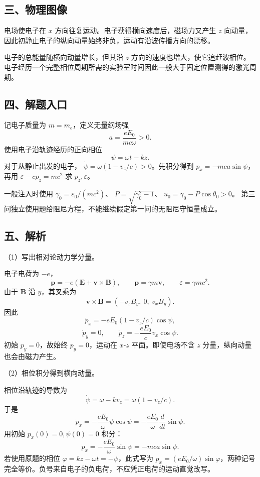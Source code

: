 \documentclass[12pt,a4paper,fontset=fandol]{ctexart}
\begin{document}
\subsection{三、物理图像}\label{ux4e09ux7269ux7406ux56feux50cf-3}

电场使电子在 \(x\) 方向往复运动。电子获得横向速度后，磁场力又产生 \(z\)
向动量，因此初静止电子的纵向动量始终非负，运动有沿波传播方向的漂移。

电子的总能量随横向动量增长，但其沿 \(z\)
方向的速度也增大，使它追赶波相位。电子经历一个完整相位周期所需的实验室时间因此一般大于固定位置测得的激光周期。

\subsection{四、解题入口}\label{ux56dbux89e3ux9898ux5165ux53e3-3}

记电子质量为 \(m=m_e\)，定义无量纲场强 \[
a=\frac{eE_0}{mc\omega}>0.
\] 使用电子沿轨迹经历的正向相位 \[
\psi=\omega t-kz.
\] 对于从静止出发的电子， \(\dot\psi=\omega(1-v_z/c)>0\)。先积分得到
\(p_x=-mca\sin\psi\)，再用 \(\varepsilon-cp_z=mc^2\) 求
\(p_z,\varepsilon\)。

一般注入时使用 \(\gamma_0=\varepsilon_0/(mc^2)\)、
\(P=\sqrt{\gamma_0^2-1}\)、 \(u_0=\gamma_0-P\cos\theta_0>0\)。
第三问独立使用题给阻尼方程，不能继续假定第一问的无阻尼守恒量成立。

\subsection{五、解析}\label{ux4e94ux89e3ux6790-3}

（1）写出相对论动力学分量。

电子电荷为 \(-e\)， \[
\dot{\mathbf p}=-e(\mathbf E+\mathbf v\times\mathbf B),\qquad
\mathbf p=\gamma m\mathbf v,\qquad
\varepsilon=\gamma mc^2.
\] 由于 \(\mathbf B\) 沿 \(y\)，其叉乘为 \[
\mathbf v\times\mathbf B=(-v_zB_y,\ 0,\ v_xB_y).
\] 因此 \[
\dot p_x=-eE_0(1-v_z/c)\cos\psi,
\] \[
\dot p_y=0,\qquad
\dot p_z=-\frac{eE_0}{c}v_x\cos\psi.\tag{4.1}
\] 初始 \(p_y=0\)，故始终 \(p_y=0\)，运动在 \(x\)-\(z\)
平面。即使电场不含 \(z\) 分量，纵向动量也会由磁力产生。

（2）相位积分得到横向动量。

相位沿轨迹的导数为 \[
\dot\psi=\omega-kv_z
=\omega(1-v_z/c).
\] 于是 \[
\dot p_x=-\frac{eE_0}{\omega}\dot\psi\cos\psi
=-\frac{eE_0}{\omega}\frac{d}{dt}\sin\psi.
\] 用初始 \(p_x(0)=0,\psi(0)=0\) 积分： \[
\boxed{p_x=-\frac{eE_0}{\omega}\sin\psi=-mca\sin\psi.}\tag{4.2}
\] 若使用原题的相位 \(\varphi=kz-\omega t=-\psi\)，此式写为
\(p_x=(eE_0/\omega)\sin\varphi\)，两种记号完全等价。负号来自电子的负电荷，不应凭正电荷的运动直觉改写。
\end{document}
